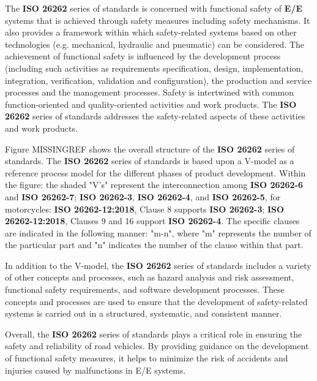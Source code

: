 \documentclass[./dissertation.tex]{subfiles}
\begin{document}
The \textbf{ISO 26262} series of standards is concerned with functional safety of \textbf{E/E} systems that is achieved through safety measures including safety mechanisms. It also provides a framework within which safety-related systems based on other technologies (e.g. mechanical, hydraulic and pneumatic) can be considered. The achievement of functional safety is influenced by the development process (including such activities as requirements specification, design, implementation, integration, verification, validation and configuration), the production and service processes and the management processes. Safety is intertwined with common function-oriented and quality-oriented activities and work products. The \textbf{ISO 26262} series of standards addresses the safety-related aspects of these activities and work products.

Figure MISSINGREF shows the overall structure of the \textbf{ISO 26262} series of standards. The \textbf{ISO 26262} series of standards is based upon a V-model as a reference process model for the different phases of product development. Within the figure: the shaded "V's" represent the interconnection among \textbf{ISO 26262-6} and \textbf{ISO 26262-7}; \textbf{ISO 26262-3}, \textbf{ISO 26262-4}, and \textbf{ISO 26262-5}, for motorcycles: \textbf{ISO 26262-12:2018}, Clause 8 supports \textbf{ISO 26262-3}; \textbf{ISO 26262-12:2018}, Clauses 9 and 16 support \textbf{ISO 26262-4}. The specific clauses are indicated in the following manner: "m-n", where "m" represents the number of the particular part and "n" indicates the number of the clause within that part.


In addition to the V-model, the \textbf{ISO 26262} series of standards includes a variety of other concepts and processes, such as hazard analysis and risk assessment, functional safety requirements, and software development processes. These concepts and processes are used to ensure that the development of safety-related systems is carried out in a structured, systematic, and consistent manner.

Overall, the \textbf{ISO 26262} series of standards plays a critical role in ensuring the safety and reliability of road vehicles. By providing guidance on the development of functional safety measures, it helps to minimize the risk of accidents and injuries caused by malfunctions in E/E systems.
\end{document}
